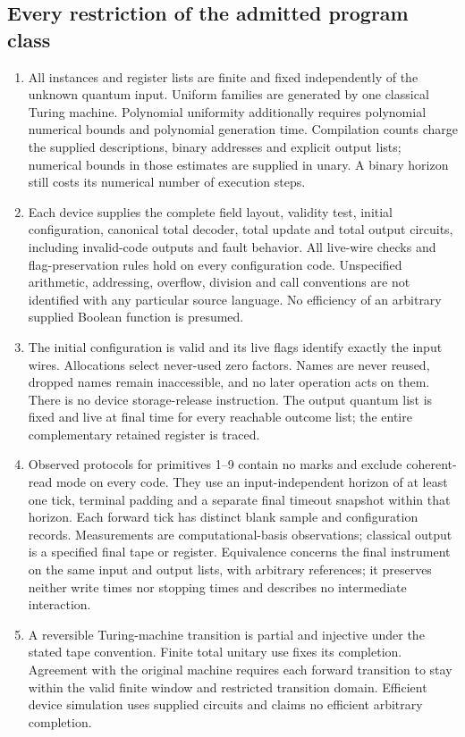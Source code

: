 \subsection{Every restriction of the admitted program class}
\begin{enumerate}
\item All instances and register lists are finite and fixed independently of the unknown quantum input. Uniform families are generated by one classical Turing machine. Polynomial uniformity additionally requires polynomial numerical bounds and polynomial generation time. Compilation counts charge the supplied descriptions, binary addresses and explicit output lists; numerical bounds in those estimates are supplied in unary. A binary horizon still costs its numerical number of execution steps.
\item Each device supplies the complete field layout, validity test, initial configuration, canonical total decoder, total update and total output circuits, including invalid-code outputs and fault behavior. All live-wire checks and flag-preservation rules hold on every configuration code. Unspecified arithmetic, addressing, overflow, division and call conventions are not identified with any particular source language. No efficiency of an arbitrary supplied Boolean function is presumed.
\item The initial configuration is valid and its live flags identify exactly the input wires. Allocations select never-used zero factors. Names are never reused, dropped names remain inaccessible, and no later operation acts on them. There is no device storage-release instruction. The output quantum list is fixed and live at final time for every reachable outcome list; the entire complementary retained register is traced.
\item Observed protocols for primitives 1--9 contain no marks and exclude coherent-read mode on every code. They use an input-independent horizon of at least one tick, terminal padding and a separate final timeout snapshot within that horizon. Each forward tick has distinct blank sample and configuration records. Measurements are computational-basis observations; classical output is a specified final tape or register. Equivalence concerns the final instrument on the same input and output lists, with arbitrary references; it preserves neither write times nor stopping times and describes no intermediate interaction.
\item A reversible Turing-machine transition is partial and injective under the stated tape convention. Finite total unitary use fixes its completion. Agreement with the original machine requires each forward transition to stay within the valid finite window and restricted transition domain. Efficient device simulation uses supplied circuits and claims no efficient arbitrary completion.

\end{enumerate}
